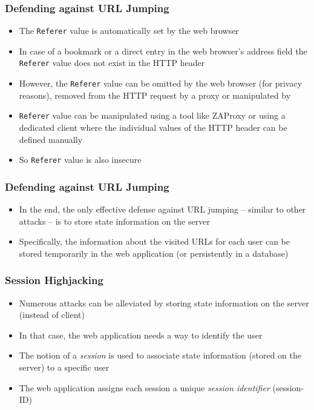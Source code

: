\begin{frame}
    \frametitle{Defending against URL Jumping}
    \begin{itemize}
        \item The \texttt{Referer} value is automatically set by the web browser
        \item In case of a bookmark or a direct entry in the web browser's address field the \texttt{Referer} value does not exist in the HTTP header
        \item However, the \texttt{Referer} value can be omitted by the web browser (for privacy reasons), removed from the HTTP request by a proxy or manipulated by \attacker
        \item \texttt{Referer} value can be manipulated using a tool like ZAProxy or using a dedicated client where the individual values of the HTTP header can be defined manually
        \item So \texttt{Referer} value is also insecure
    \end{itemize}
\end{frame}

\begin{frame}
    \frametitle{Defending against URL Jumping}
    \begin{itemize}
        \item In the end, the only effective defense against URL jumping -- similar to other attacks -- is to store state information on the server
        \item Specifically, the information about the visited URLs for each user can be stored temporarily in the web application (or persistently in a database)
    \end{itemize}
\end{frame}


\begin{frame}
    \frametitle{Session Highjacking}
    \begin{itemize}
        \item Numerous attacks can be alleviated by storing state information on the server (instead of client)
        \item In that case, the web application needs a way to identify the user
        \item The notion of a \emph{session} is used to associate state information (stored on the server) to a specific user
        \item The web application assigns each session a unique \emph{session identifier} (session-ID)
    \end{itemize}
\end{frame}

